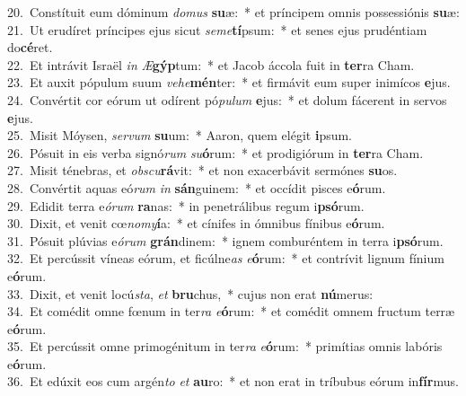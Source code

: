 {20.~}Constítuit eum dóminum \textit{do}\textit{mus} \textbf{su}æ:~* et príncipem omnis possessiónis \textbf{su}æ:\\
{21.~}Ut erudíret príncipes ejus sicut \textit{se}\textit{me}\textbf{tí}psum:~* et senes ejus prudéntiam do\textbf{cé}ret.\\
{22.~}Et intrávit Israël \textit{in} \textit{Æ}\textbf{gýp}tum:~* et Jacob áccola fuit in \textbf{ter}ra Cham.\\
{23.~}Et auxit pópulum suum \textit{ve}\textit{he}\textbf{mén}ter:~* et firmávit eum super inimícos \textbf{e}jus.\\
{24.~}Convértit cor eórum ut odírent pó\textit{pu}\textit{lum} \textbf{e}jus:~* et dolum fácerent in servos \textbf{e}jus.\\
{25.~}Misit Móysen, \textit{ser}\textit{vum} \textbf{su}um:~* Aaron, quem elégit \textbf{i}psum.\\
{26.~}Pósuit in eis verba signó\textit{rum} \textit{su}\textbf{ó}rum:~* et prodigiórum in \textbf{ter}ra Cham.\\
{27.~}Misit ténebras, et \textit{ob}\textit{scu}\textbf{rá}vit:~* et non exacerbávit sermónes \textbf{su}os.\\
{28.~}Convértit aquas eó\textit{rum} \textit{in} \textbf{sán}guinem:~* et occídit pisces e\textbf{ó}rum.\\
{29.~}Edidit terra e\textit{ó}\textit{rum} \textbf{ra}nas:~* in penetrálibus regum i\textbf{psó}rum.\\
{30.~}Dixit, et venit cœ\textit{no}\textit{my}\textbf{í}a:~* et cínifes in ómnibus fínibus e\textbf{ó}rum.\\
{31.~}Pósuit plúvias e\textit{ó}\textit{rum} \textbf{grán}dinem:~* ignem comburéntem in terra i\textbf{psó}rum.\\
{32.~}Et percússit víneas eórum, et ficúlne\textit{as} \textit{e}\textbf{ó}rum:~* et contrívit lignum fínium e\textbf{ó}rum.\\
{33.~}Dixit, et venit locú\textit{sta}, \textit{et} \textbf{bru}chus,~* cujus non erat \textbf{nú}merus:\\
{34.~}Et comédit omne fœnum in ter\textit{ra} \textit{e}\textbf{ó}rum:~* et comédit omnem fructum terræ e\textbf{ó}rum.\\
{35.~}Et percússit omne primogénitum in ter\textit{ra} \textit{e}\textbf{ó}rum:~* primítias omnis labóris e\textbf{ó}rum.\\
{36.~}Et edúxit eos cum argén\textit{to} \textit{et} \textbf{au}ro:~* et non erat in tríbubus eórum in\textbf{fír}mus.\\
